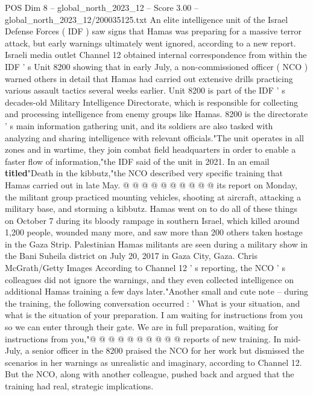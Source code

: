\begin{textsample}{POS Dim 8 – global\_north\_2023\_12 – Score 3.00 – global\_north\_2023\_12/200035125.txt}  \label{ex:f8_pos_280}
An elite intelligence unit of the Israel Defense Forces ( IDF ) saw signs that Hamas was preparing for a massive terror attack, but early warnings ultimately went ignored, according to a new report.
Israeli media outlet Channel 12 obtained internal correspondence from within the IDF ' s Unit 8200 showing that in early July, a non-commissioned officer ( NCO ) warned others in detail that Hamas had carried out extensive drills practicing various assault tactics several weeks earlier.
Unit 8200 is part of the IDF ' s decades-old Military Intelligence Directorate, which is responsible for collecting and processing intelligence from enemy groups like Hamas. 8200 is the directorate ' s main information gathering unit, and its soldiers are also tasked with analyzing and sharing intelligence with relevant officials."The unit operates in all zones and in wartime, they join combat field headquarters in order to enable a faster flow of information,"the IDF said of the unit in 2021.
In an email \textbf{titled}"Death in the kibbutz,"the NCO described very specific training that Hamas carried out in late May. @ @ @ @ @ @ @ @ @ @ its report on Monday, the militant group practiced mounting vehicles, shooting at aircraft, attacking a military base, and storming a kibbutz.
Hamas went on to do all of these things on October 7 during its bloody rampage in southern Israel, which killed around 1,200 people, wounded many more, and saw more than 200 others taken hostage in the Gaza Strip.
Palestinian Hamas militants are seen during a military show in the Bani Suheila district on July 20, 2017 in Gaza City, Gaza.
Chris McGrath/Getty Images According to Channel 12 ' s reporting, the NCO ' s colleagues did not ignore the warnings, and they even collected intelligence on additional Hamas training a few days later."Another small and cute note -- during the training, the following conversation occurred : ' What is your situation, and what is the situation of your preparation.
I am waiting for instructions from you so we can enter through their gate.
We are in full preparation, waiting for instructions from you,"@ @ @ @ @ @ @ @ @ @ reports of new training.
In mid-July, a senior officer in the 8200 praised the NCO for her work but dismissed the scenarios in her warnings as unrealistic and imaginary, according to Channel 12.
But the NCO, along with another colleague, pushed back and argued that the training had real, strategic implications.

\end{textsample}
